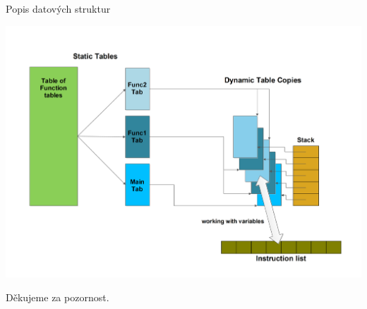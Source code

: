 \documentclass{beamer}
\begin{document}
\begin{frame}{Popis datových struktur}
  \begin{center}
    \includegraphics[trim=0 0 0 20px, scale=0.38]{tables.pdf}
  \end{center}
\end{frame}

\begin{frame}
  \begin{center}
  {\LARGE Děkujeme za pozornost.}
  \end{center}
\end{frame}
\end{document}
